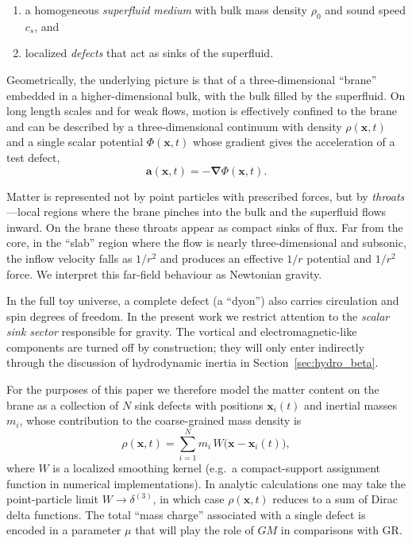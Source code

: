 \documentclass[11pt]{article}
\newcommand{\cS}{c_s}
\begin{document}
\begin{enumerate}
  \item a homogeneous \emph{superfluid medium} with bulk mass density $\rho_0$ and sound speed $\cS$, and
  \item localized \emph{defects} that act as sinks of the superfluid.
\end{enumerate}

Geometrically, the underlying picture is that of a three-dimensional ``brane'' embedded in a higher-dimensional bulk, with the bulk filled by the superfluid. On long length scales and for weak flows, motion is effectively confined to the brane and can be described by a three-dimensional continuum with density $\rho(\mathbf{x},t)$ and a single scalar potential $\Phi(\mathbf{x},t)$ whose gradient gives the acceleration of a test defect,
\begin{equation}
  \mathbf{a}(\mathbf{x},t) = -\bm{\nabla} \Phi(\mathbf{x},t).
\end{equation}

Matter is represented not by point particles with prescribed forces, but by \emph{throats}---local regions where the brane pinches into the bulk and the superfluid flows inward. On the brane these throats appear as compact sinks of flux. Far from the core, in the ``slab'' region where the flow is nearly three-dimensional and subsonic, the inflow velocity falls as $1/r^2$ and produces an effective $1/r$ potential and $1/r^2$ force. We interpret this far-field behaviour as Newtonian gravity.

In the full toy universe, a complete defect (a ``dyon'') also carries circulation and spin degrees of freedom. In the present work we restrict attention to the \emph{scalar sink sector} responsible for gravity. The vortical and electromagnetic-like components are turned off by construction; they will only enter indirectly through the discussion of hydrodynamic inertia in Section~\ref{sec:hydro_beta}.

For the purposes of this paper we therefore model the matter content on the brane as a collection of $N$ sink defects with positions $\mathbf{x}_i(t)$ and inertial masses $m_i$, whose contribution to the coarse-grained mass density is
\begin{equation}
  \rho(\mathbf{x},t)
  = \sum_{i=1}^N m_i\, W\bigl(\mathbf{x} - \mathbf{x}_i(t)\bigr),
  \label{eq:rho_def}
\end{equation}
where $W$ is a localized smoothing kernel (e.g.\ a compact-support assignment function in numerical implementations). In analytic calculations one may take the point-particle limit $W \to \delta^{(3)}$, in which case $\rho(\mathbf{x},t)$ reduces to a sum of Dirac delta functions. The total ``mass charge'' associated with a single defect is encoded in a parameter $\mu$ that will play the role of $GM$ in comparisons with GR.
\end{document}
